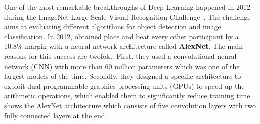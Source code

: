 One of the most remarkable breakthroughs of Deep Learning happened in 2012 during the ImageNet Large-Scale Visual Recognition Challenge~\cite{russakovsky2015imagenet}.
The challenge aims at evaluating different algorithms for object detection and image classification.
In 2012, \citeauthor{krizhevsky2012imagenet} obtained  place and beat every other participant by a 10.8\% margin with a neural network architecture called \textbf{AlexNet}.
The main reasons for this success are twofold.
First, they used a convolutional neural network (CNN) with more than 60 million parameters which was one of the largest models of the time.
Secondly, they designed a specific architecture to exploit dual programmable graphics processing units (GPUs) to speed up the arithmetic operations, which enabled them to significantly reduce training time.
 shows the AlexNet architecture which consists of five convolution layers with two fully connected layers at the end.


